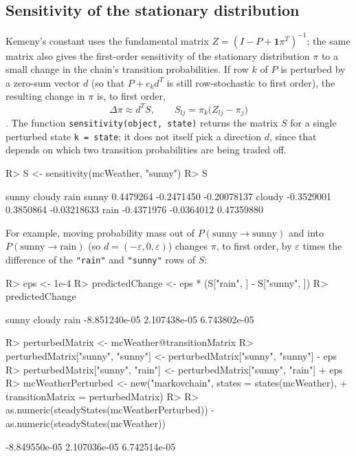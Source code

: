 \documentclass[
  nojss]{jss}
\begin{document}
\subsection{Sensitivity of the stationary distribution}\label{sensitivity-of-the-stationary-distribution}

Kemeny's constant uses the fundamental matrix
\(Z=(I-P+\mathbf{1}\pi^T)^{-1}\); the same matrix also gives the first-order
sensitivity of the stationary distribution \(\pi\) to a small change in the
chain's transition probabilities. If row \(k\) of \(P\) is perturbed by a
zero-sum vector \(d\) (so that \(P+e_k d^T\) is still row-stochastic to first
order), the resulting change in \(\pi\) is, to first order,
\[
\Delta\pi \approx d^T S, \qquad S_{lj} = \pi_k\bigl(Z_{lj}-\pi_j\bigr)
\]
\citep{schweitzer1968perturbation,meyer1980perturbation,choMeyer2001}. The
function \texttt{sensitivity(object,\ state)} returns the matrix \(S\) for a single
perturbed state \texttt{k\ =\ state}; it does not itself pick a direction \(d\), since
that depends on which two transition probabilities are being traded off.

\begin{CodeChunk}
\begin{CodeInput}
R> S <- sensitivity(mcWeather, "sunny")
R> S
\end{CodeInput}
\begin{CodeOutput}
            sunny     cloudy        rain
sunny   0.4479264 -0.2471450 -0.20078137
cloudy -0.3529001  0.3850864 -0.03218633
rain   -0.4371976 -0.0364012  0.47359880
\end{CodeOutput}
\end{CodeChunk}

For example, moving probability mass out of \(P(\text{sunny}\to\text{sunny})\)
and into \(P(\text{sunny}\to\text{rain})\) (so \(d=(-\varepsilon,0,\varepsilon)\))
changes \(\pi\), to first order, by \(\varepsilon\) times the difference of the
\texttt{"rain"} and \texttt{"sunny"} rows of \(S\):

\begin{CodeChunk}
\begin{CodeInput}
R> eps <- 1e-4
R> predictedChange <- eps * (S["rain", ] - S["sunny", ])
R> predictedChange
\end{CodeInput}
\begin{CodeOutput}
        sunny        cloudy          rain 
-8.851240e-05  2.107438e-05  6.743802e-05 
\end{CodeOutput}
\begin{CodeInput}
R> perturbedMatrix <- mcWeather@transitionMatrix
R> perturbedMatrix["sunny", "sunny"] <- perturbedMatrix["sunny", "sunny"] - eps
R> perturbedMatrix["sunny", "rain"] <- perturbedMatrix["sunny", "rain"] + eps
R> mcWeatherPerturbed <- new("markovchain", states = states(mcWeather),
+                           transitionMatrix = perturbedMatrix)
R> 
R> as.numeric(steadyStates(mcWeatherPerturbed)) - as.numeric(steadyStates(mcWeather))
\end{CodeInput}
\begin{CodeOutput}
[1] -8.849550e-05  2.107036e-05  6.742514e-05
\end{CodeOutput}
\end{CodeChunk}
\end{document}
